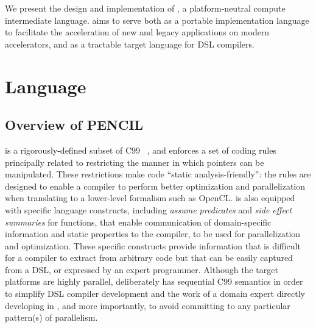 % 

We present the design and implementation of \pencil, a plat\-form-neu\-tral 
compute intermediate language.
\pencil aims to serve both as a portable implementation language to facilitate 
the acceleration of new and legacy applications on modern accelerators, and as 
a tractable target language for DSL compilers.


\section{\pencil Language}

\subsection{Overview of PENCIL \label{pencil-overview}}

\pencil is a rigorously-defined subset of C99~\cite{c99}
, and enforces a set of
coding rules principally related to restricting the manner in which pointers
can be manipulated.  These restrictions make \pencil code
``static analysis-friendly'': the rules are designed to enable a compiler
to perform better optimization and parallelization when translating \pencil
to a lower-level formalism such as OpenCL.
\pencil is also equipped with specific language constructs, including
\emph{assume predicates} and \emph{side effect summaries} for functions,
that enable communication of domain-specific information and static properties
to the \pencil compiler, to be used for parallelization and optimization.
These specific constructs provide information that is difficult for a
compiler to extract from arbitrary code but that can be easily captured from a DSL, or
expressed by an expert programmer.
Although the target platforms are highly parallel,
\pencil deliberately has sequential C99 semantics in order to simplify DSL
compiler development and the work of a domain expert directly
developing in \pencil, and more importantly, to avoid committing to
any particular pattern(s) of parallelism.

